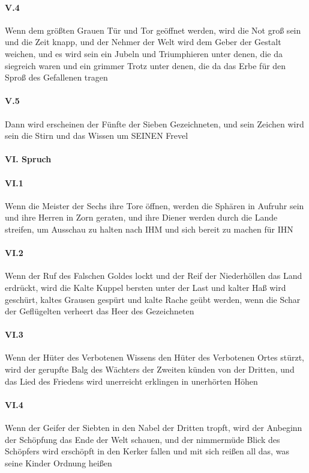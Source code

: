 \paragraph{V.4} Wenn dem größten Grauen Tür und Tor geöffnet werden, wird die Not groß sein und die Zeit knapp, und der Nehmer der Welt wird dem Geber der Gestalt weichen, und es wird sein ein Jubeln und Triumphieren unter denen, die da siegreich waren und ein grimmer Trotz unter denen, die da das Erbe für den Sproß des Gefallenen tragen

\paragraph{V.5} Dann wird erscheinen der Fünfte der Sieben Gezeichneten, und sein Zeichen wird sein die Stirn und das Wissen um SEINEN Frevel

\paragraph{VI. Spruch}

\paragraph{VI.1} Wenn die Meister der Sechs ihre Tore öffnen, werden die Sphären in Aufruhr sein und ihre Herren in Zorn geraten, und ihre Diener werden durch die Lande streifen, um Ausschau zu halten nach IHM und sich bereit zu machen für IHN

\paragraph{VI.2} Wenn der Ruf des Falschen Goldes lockt und der Reif der Niederhöllen das Land erdrückt, wird die Kalte Kuppel bersten unter der Last und kalter Haß wird geschürt, kaltes Grausen gespürt und kalte Rache geübt werden, wenn die Schar der Geflügelten verheert das Heer des Gezeichneten

\paragraph{VI.3} Wenn der Hüter des Verbotenen Wissens den Hüter des Verbotenen Ortes stürzt, wird der gerupfte Balg des Wächters der Zweiten künden von der Dritten, und das Lied des Friedens wird unerreicht erklingen in unerhörten Höhen

\paragraph{VI.4} Wenn der Geifer der Siebten in den Nabel der Dritten tropft, wird der Anbeginn der Schöpfung das Ende der Welt schauen, und der nimmermüde Blick des Schöpfers wird erschöpft in den Kerker fallen und mit sich reißen all das, was seine Kinder Ordnung heißen

